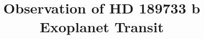 \documentclass[twocolumn]{aastex631}
\begin{document}
\title{Observation of HD 189733 b Exoplanet Transit}


\end{document}
